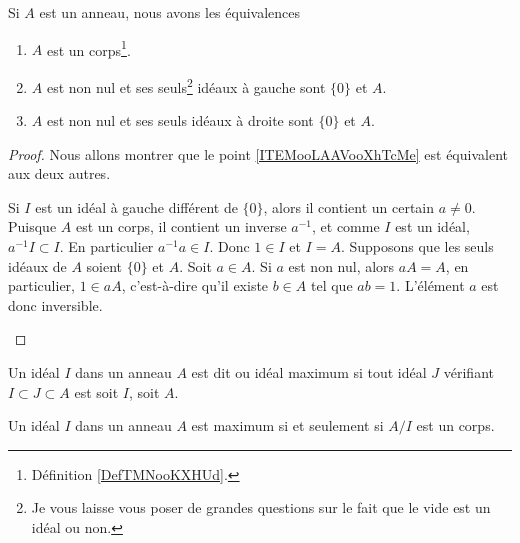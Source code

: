 \begin{proposition}     \label{AnnCorpsIdeal}\label{PROPooUOCVooZGAVVk}
	Si \( A\) est un anneau, nous avons les équivalences
	\begin{enumerate}
		\item       \label{ITEMooLAAVooXhTcMe}
		      \( A\) est un corps\footnote{Définition \ref{DefTMNooKXHUd}.}.
		\item       \label{ITEMooDGZIooRopYGx}
		      \( A\) est non nul et ses seuls\footnote{Je vous laisse vous poser de grandes questions sur le fait que le vide est un idéal ou non.} idéaux à gauche sont \( \{ 0 \}\) et \( A\).
		\item       \label{ITEMooLPWHooDJpTbR}
		      \( A\) est non nul et ses seuls idéaux à droite sont \( \{ 0 \}\) et \( A\).
	\end{enumerate}
\end{proposition}

\begin{proof}
	Nous allons montrer que le point \ref{ITEMooLAAVooXhTcMe} est équivalent aux deux autres.
	\begin{subproof}
		Si \( I\) est un idéal à gauche différent de \( \{ 0 \}\), alors il contient un certain \( a\neq 0\). Puisque \( A\) est un corps, il contient un inverse \( a^{-1}\), et comme \( I\) est un idéal, \( a^{-1} I\subset I\). En particulier \( a^{-1}a\in I\). Donc \( 1\in I\) et \( I=A\).
		Supposons que les seuls idéaux de \( A\) soient \( \{ 0 \}\) et \( A\). Soit \( a\in A\). Si \( a\) est non nul, alors \( aA=A\), en particulier, \( 1\in aA\), c'est-à-dire qu'il existe \( b\in A\) tel que \( ab=1\). L'élément \( a\) est donc inversible.
	\end{subproof}
\end{proof}

\begin{definition}\label{DEFIdealMax}
	Un idéal \( I\) dans un anneau \( A \) est dit  ou idéal maximum si tout idéal \( J \) vérifiant \( I \subset J \subset A \) est soit \( I \), soit \( A \).
\end{definition}

\begin{proposition}     \label{PROPooSHHWooCyZPPw}
	Un idéal \( I\) dans un anneau \( A \) est maximum si et seulement si \( A/I\) est un corps.
\end{proposition}

